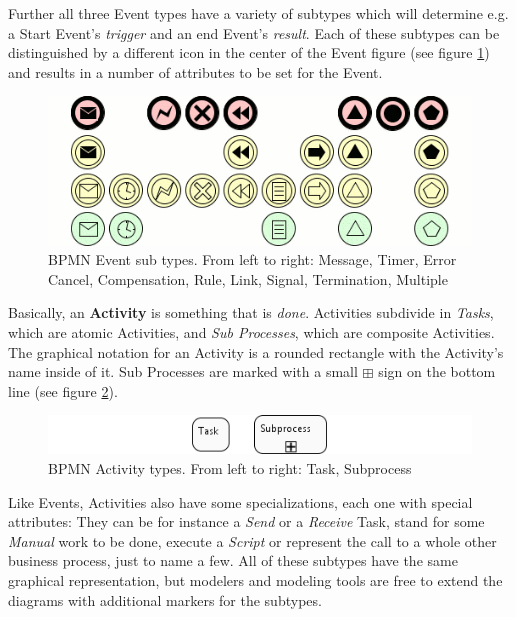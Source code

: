 Further all three Event types have a variety of subtypes which will determine
e.g. a Start Event's \emph{trigger} and an end Event's \emph{result}.  Each of
these subtypes can be distinguished by a different icon in the center of the Event
figure (see figure \ref{fig:triggers}) and results in a number of attributes to
be set for the Event.

\begin{figure}[ht]
	\centering
	\includegraphics[width=.75\textwidth]{figures/bpmn/triggers.png}
	\caption[BPMN Event sub types]{BPMN Event sub types.  From left to right:
	Message, Timer, Error Cancel, Compensation, Rule, Link, Signal, Termination,
	Multiple}
	\label{fig:triggers}
\end{figure}

Basically, an \textbf{Activity} is something that is \emph{done}.  Activities
subdivide in \emph{Tasks}, which are atomic Activities, and \emph{Sub Processes},
which are composite Activities.  The graphical notation for an Activity is a
rounded rectangle with the Activity's name inside of it.  Sub Processes are marked
with a small $ \boxplus $ sign on the bottom line (see figure \ref{fig:activities}).

\begin{figure}[ht]
	\centering
	\includegraphics[width=.75\textwidth]{figures/bpmn/activities.png}
	\caption[BPMN Activity types]{BPMN Activity types.  From left to right: Task,
	Subprocess}
	\label{fig:activities}
\end{figure}

Like Events, Activities also have some specializations, each one with special
attributes: They can be for instance a \emph{Send} or a \emph{Receive} Task, stand
for some \emph{Manual} work to be done, execute a \emph{Script} or represent the
call to a whole other business process, just to name a few.  All of these subtypes
have the same graphical representation, but modelers and modeling tools are
free to extend the diagrams with additional markers for the subtypes.

